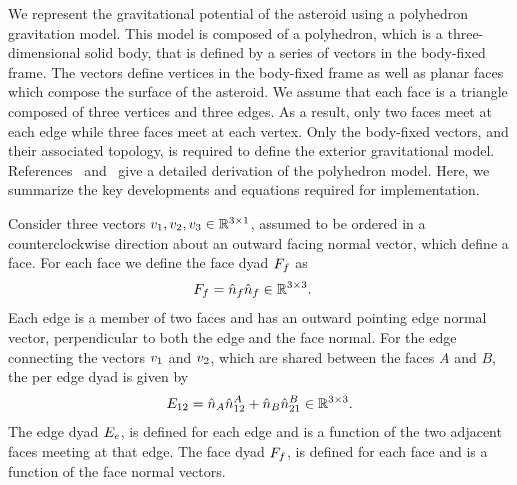 \documentclass[journal]{new-aiaa}
\begin{document}
We represent the gravitational potential of the asteroid using a polyhedron gravitation model.
This model is composed of a polyhedron, which is a three-dimensional solid body, that is defined by a series of vectors in the body-fixed frame.
The vectors define vertices in the body-fixed frame as well as planar faces which compose the surface of the asteroid.
We assume that each face is a triangle composed of three vertices and three edges.
As a result, only two faces meet at each edge while three faces meet at each vertex.
Only the body-fixed vectors, and their associated topology, is required to define the exterior gravitational model.
References~\cite{werner1994} and~\cite{werner1996} give a detailed derivation of the polyhedron model.
Here, we summarize the key developments and equations required for implementation.

Consider three vectors \( v_1, v_2, v_3 \in \mathbb{R}^{3 \times 1} \), assumed to be ordered in a counterclockwise direction about an outward facing normal vector, which define a face.
For each face we define the face dyad \( F_f \) as
\begin{align}\label{eq:face_dyad}
    F_f &= \hat{n}_f \hat{n}_f \in \mathbb{R}^{3 \times 3}.
\end{align}
Each edge is a member of two faces and has an outward pointing edge normal vector, perpendicular to both the edge and the face normal.
For the edge connecting the vectors \( v_1 \) and \( v_2 \), which are shared between the faces \(A\) and \( B\), the per edge dyad is given by
\begin{align}\label{eq:edge_dyad}
    E_{12} = \hat{n}_A \hat{n}_{12}^A + \hat{n}_B \hat{n}_{21}^B \in \mathbb{R}^{3 \times 3}.
\end{align}
The edge dyad \( E_e  \), is defined for each edge and is a function of the two adjacent faces meeting at that edge.
The face dyad \( F_f \), is defined for each face and is a function of the face normal vectors.
\end{document}
